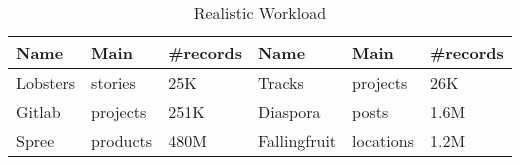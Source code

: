 \begin{table}
  \caption{Realistic Workload %
  }
  \label{realworkload}
  \begin{tabular}{lll|lll}
  \toprule
  
	Name&Main &\#records & Name&Main &\#records\\
  \midrule
	Lobsters&stories&25K & Tracks&projects&26K\\
  
    \midrule
	Gitlab&projects&251K & Diaspora&posts&1.6M\\
      \midrule
	Spree&products&480M & Fallingfruit&locations&1.2M\\
 
 \bottomrule

\end{tabular}

\end{table}